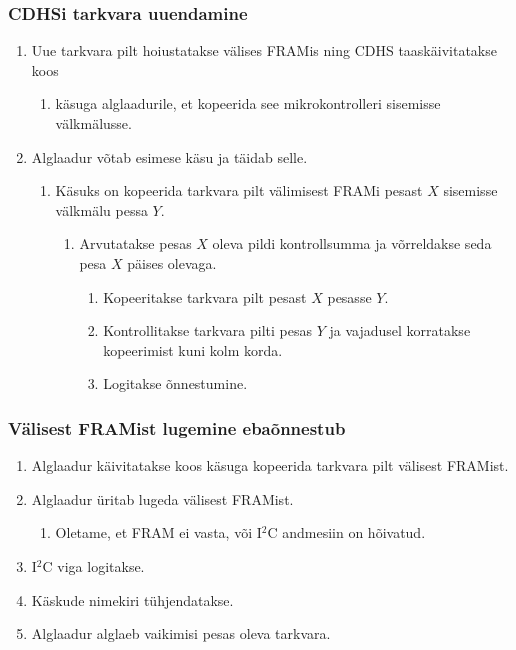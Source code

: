 \documentclass[12pt,a4paper]{article}
\newcommand{\iic}{I${}^2$C }
\begin{document}
\subsubsection{CDHSi tarkvara uuendamine}
\label{sec:usecase:upgrade}
\begin{enumerate}
	\item Uue tarkvara pilt hoiustatakse välises FRAMis ning CDHS
		taaskäivitatakse koos
		\begin{enumerate}
			\item käsuga alglaadurile, et kopeerida see mikrokontrolleri
				sisemisse välkmälusse.
		\end{enumerate}
	\item Alglaadur võtab esimese käsu ja täidab selle.
		\begin{enumerate}
			\item Käsuks on kopeerida tarkvara pilt välimisest FRAMi pesast \(X\)
				sisemisse välkmälu pessa \(Y\).
				\begin{enumerate}
					\item Arvutatakse pesas \(X\) oleva pildi kontrollsumma ja
						võrreldakse seda pesa \(X\) päises olevaga.
						\begin{enumerate}
							\item Kopeeritakse tarkvara pilt pesast \(X\) pesasse \(Y\).
							\item Kontrollitakse tarkvara pilti pesas \(Y\) ja
								vajadusel korratakse kopeerimist kuni kolm
								korda.
							\item Logitakse õnnestumine.
						\end{enumerate}
				\end{enumerate}
		\end{enumerate}
\end{enumerate}

\subsubsection{Välisest FRAMist lugemine ebaõnnestub}
\label{sec:usecase:framerror}
\begin{enumerate}
	\item Alglaadur käivitatakse koos käsuga kopeerida tarkvara pilt välisest
		FRAMist.
	\item Alglaadur üritab lugeda välisest FRAMist.
		\begin{enumerate}
		\item Oletame, et FRAM ei vasta, või \iic andmesiin on hõivatud.
		\end{enumerate}
	\item \iic viga logitakse.
	\item Käskude nimekiri tühjendatakse.
	\item Alglaadur alglaeb vaikimisi pesas oleva tarkvara.
\end{enumerate}
\end{document}
